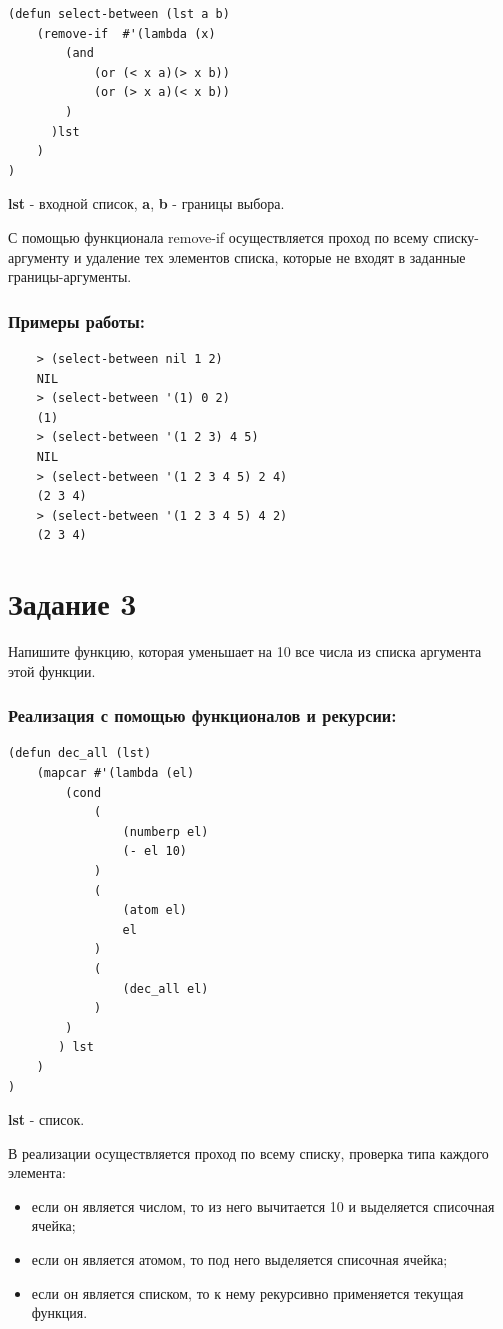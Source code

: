 \documentclass[a4paper, 12pt]{article}
\begin{document}
\begin{lstlisting}[caption=Функция выборки из списка по границам]
(defun select-between (lst a b)
	(remove-if	#'(lambda (x) 
		(and 
			(or (< x a)(> x b)) 
			(or (> x a)(< x b))
		)
	  )lst
	)
)
\end{lstlisting}
\textbf{lst} -  входной список, \textbf{a}, \textbf{b}  -  границы выбора.

С помощью функционала remove-if осуществляется проход по всему списку-аргументу и удаление тех элементов списка, которые не входят в заданные границы-аргументы.

\subsubsection*{Примеры работы:}
\begin{lstlisting}
	> (select-between nil 1 2)
	NIL
	> (select-between '(1) 0 2)
	(1)
	> (select-between '(1 2 3) 4 5)
	NIL
	> (select-between '(1 2 3 4 5) 2 4)
	(2 3 4)
	> (select-between '(1 2 3 4 5) 4 2)
	(2 3 4)
\end{lstlisting}

\section*{Задание 3}
Напишите функцию, которая уменьшает на 10 все числа из списка аргумента этой функции.

\subsubsection*{Реализация с помощью функционалов и рекурсии:}
\begin{lstlisting}[caption=Функция уменьшения всех чисел смиска на 10]
(defun dec_all (lst)
	(mapcar #'(lambda (el)
		(cond
			(
				(numberp el)
				(- el 10)
			)
			(
				(atom el)
				el
			)
			(
				(dec_all el)
			)
		)
	   ) lst
	)
)
\end{lstlisting}
\textbf{lst} - список.

В реализации осуществляется проход по всему списку, проверка типа каждого элемента: 
\begin{itemize}
	\item если он является числом, то из него вычитается 10 и выделяется списочная ячейка; 
	\item если он является атомом, то под него выделяется списочная ячейка;
	\item если он является списком, то к нему рекурсивно применяется текущая функция.
\end{itemize}
\end{document}
